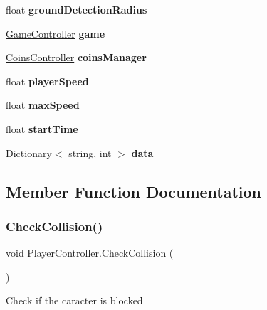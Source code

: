 \begin{DoxyCompactItemize}
float {\bfseries ground\+Detection\+Radius}
\item 
\mbox{\label{class_player_controller_aa1b9dc10215a52cffecd40e6cd1d288b}} 
\mbox{\hyperlink{class_game_controller}{Game\+Controller}} {\bfseries game}
\item 
\mbox{\label{class_player_controller_aec8ada49cc95016279888cb367df73f8}} 
\mbox{\hyperlink{class_coins_controller}{Coins\+Controller}} {\bfseries coins\+Manager}
\item 
\mbox{\label{class_player_controller_ad7f03e37ff7be11e361f8f45526fabad}} 
float {\bfseries player\+Speed}
\item 
\mbox{\label{class_player_controller_aff8eb92a976293c031846b039d90913f}} 
float {\bfseries max\+Speed}
\item 
\mbox{\label{class_player_controller_af8a5775a0b2b66542b271b23583723fe}} 
float {\bfseries start\+Time}
\item 
Dictionary$<$ string, int $>$ {\bfseries data}
\end{DoxyCompactItemize}


\subsection{Member Function Documentation}
\mbox{\label{class_player_controller_a65f9b3e3c8ea9f67fa664dff208e5b76}} 
\subsubsection{\texorpdfstring{Check\+Collision()}{CheckCollision()}}
{\footnotesize\ttfamily void Player\+Controller.\+Check\+Collision (\begin{DoxyParamCaption}{ }\end{DoxyParamCaption})\hspace{0.3cm}{\ttfamily [private]}}

Check if the caracter is blocked \mbox{\label{class_player_controller_a154ebcc87f1dd283da03bf6e02a3d1d8}} 
